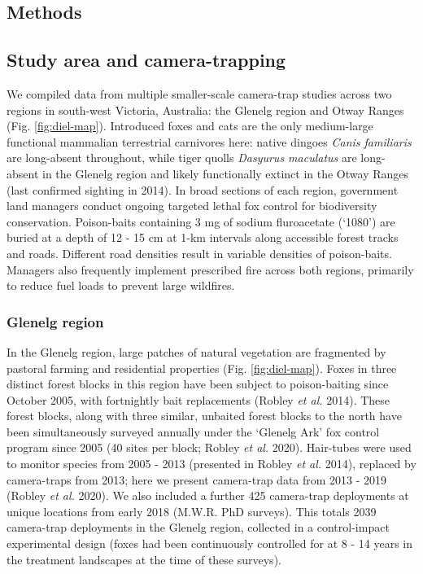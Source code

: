 \documentclass[11pt,a4paper,titlepage,twoside,openright]{style/unimelbthesis}
\begin{document}
\begin{mainmatter}
\newpage

\hypertarget{methods-3}{%
\section{Methods}\label{methods-3}}

\hypertarget{study-area-and-camera-trapping}{%
\subsection{Study area and camera-trapping}\label{study-area-and-camera-trapping}}

We compiled data from multiple smaller-scale camera-trap studies across two regions in south-west Victoria, Australia: the Glenelg region and Otway Ranges (Fig. \ref{fig:diel-map}). Introduced foxes and cats are the only medium-large functional mammalian terrestrial carnivores here: native dingoes \emph{Canis familiaris} are long-absent throughout, while tiger quolls \emph{Dasyurus maculatus} are long-absent in the Glenelg region and likely functionally extinct in the Otway Ranges (last confirmed sighting in 2014). In broad sections of each region, government land managers conduct ongoing targeted lethal fox control for biodiversity conservation. Poison-baits containing 3 mg of sodium fluroacetate (`1080') are buried at a depth of 12 - 15 cm at 1-km intervals along accessible forest tracks and roads. Different road densities result in variable densities of poison-baits. Managers also frequently implement prescribed fire across both regions, primarily to reduce fuel loads to prevent large wildfires.

\hypertarget{glenelg-region-2}{%
\subsubsection{Glenelg region}\label{glenelg-region-2}}

In the Glenelg region, large patches of natural vegetation are fragmented by pastoral farming and residential properties (Fig. \ref{fig:diel-map}). Foxes in three distinct forest blocks in this region have been subject to poison-baiting since October 2005, with fortnightly bait replacements (Robley \emph{et al.} 2014). These forest blocks, along with three similar, unbaited forest blocks to the north have been simultaneously surveyed annually under the `Glenelg Ark' fox control program since 2005 (40 sites per block; Robley \emph{et al.} 2020). Hair-tubes were used to monitor species from 2005 - 2013 (presented in Robley \emph{et al.} 2014), replaced by camera-traps from 2013; here we present camera-trap data from 2013 - 2019 (Robley \emph{et al.} 2020). We also included a further 425 camera-trap deployments at unique locations from early 2018 (M.W.R. PhD surveys). This totals 2039 camera-trap deployments in the Glenelg region, collected in a control-impact experimental design (foxes had been continuously controlled for at 8 - 14 years in the treatment landscapes at the time of these surveys).


\end{mainmatter}
\end{document}
